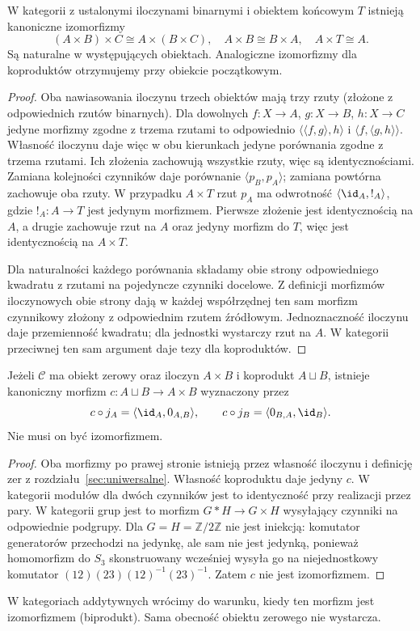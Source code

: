 \begin{stwierdzenie}\label{cat:prop:product-coherence}
W kategorii z ustalonymi iloczynami binarnymi i obiektem końcowym $T$ istnieją kanoniczne izomorfizmy
\[
(A\times B)\times C\cong A\times(B\times C),\quad
A\times B\cong B\times A,\quad A\times T\cong A.
\]
Są naturalne w występujących obiektach. Analogiczne izomorfizmy dla koproduktów otrzymujemy przy obiekcie początkowym.
\end{stwierdzenie}
\begin{proof}
Oba nawiasowania iloczynu trzech obiektów mają trzy rzuty (złożone z odpowiednich rzutów binarnych). Dla dowolnych $f:X\to A$, $g:X\to B$, $h:X\to C$ jedyne morfizmy zgodne z trzema rzutami to odpowiednio $\langle\langle f,g\rangle,h\rangle$ i $\langle f,\langle g,h\rangle\rangle$. Własność iloczynu daje więc w obu kierunkach jedyne porównania zgodne z trzema rzutami. Ich złożenia zachowują wszystkie rzuty, więc są identycznościami. Zamiana kolejności czynników daje porównanie $\langle p_B,p_A\rangle$; zamiana powtórna zachowuje oba rzuty. W przypadku $A\times T$ rzut $p_A$ ma odwrotność $\langle\id_A,!_A\rangle$, gdzie $!_A:A\to T$ jest jedynym morfizmem. Pierwsze złożenie jest identycznością na $A$, a drugie zachowuje rzut na $A$ oraz jedyny morfizm do $T$, więc jest identycznością na $A\times T$.

Dla naturalności każdego porównania składamy obie strony odpowiedniego kwadratu z rzutami na pojedyncze czynniki docelowe. Z definicji morfizmów iloczynowych obie strony dają w każdej współrzędnej ten sam morfizm czynnikowy złożony z odpowiednim rzutem źródłowym. Jednoznaczność iloczynu daje przemienność kwadratu; dla jednostki wystarczy rzut na $A$. W kategorii przeciwnej ten sam argument daje tezy dla koproduktów.
\end{proof}

\begin{stwierdzenie}\label{cat:prop:coprod-product}
Jeżeli $\mathcal C$ ma obiekt zerowy oraz iloczyn $A\times B$ i koprodukt $A\sqcup B$, istnieje kanoniczny morfizm $c:A\sqcup B\to A\times B$ wyznaczony przez
\[
c\circ j_A=\langle\id_A,0_{A,B}\rangle,\qquad
c\circ j_B=\langle0_{B,A},\id_B\rangle.
\]
Nie musi on być izomorfizmem.
\end{stwierdzenie}
\begin{proof}
Oba morfizmy po prawej stronie istnieją przez własność iloczynu i definicję zer z rozdziału~\ref{sec:uniwersalne}. Własność koproduktu daje jedyny $c$. W kategorii modułów dla dwóch czynników jest to identyczność przy realizacji przez pary. W kategorii grup jest to morfizm $G*H\to G\times H$ wysyłający czynniki na odpowiednie podgrupy. Dla $G=H=\mathbb Z/2\mathbb Z$ nie jest iniekcją: komutator generatorów przechodzi na jedynkę, ale sam nie jest jedynką, ponieważ homomorfizm do $S_3$ skonstruowany wcześniej wysyła go na niejednostkowy komutator $(12)(23)(12)^{-1}(23)^{-1}$. Zatem $c$ nie jest izomorfizmem.
\end{proof}

W kategoriach addytywnych wrócimy do warunku, kiedy ten morfizm jest izomorfizmem (biprodukt). Sama obecność obiektu zerowego nie wystarcza.

